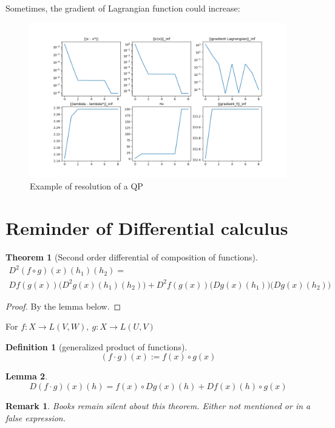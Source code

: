 \documentclass{report}
\newtheorem{theo}{Theorem}[section]
\newtheorem{lem}[theo]{Lemma}
\newtheorem{defi}{Definition}[section]
\newtheorem*{remark}{Remark}
\begin{document}
 Sometimes, the gradient of Lagrangian function could increase:
 \begin{figure}[h]
\centering
\includegraphics[scale=0.5]{monter3}
\caption{Example of resolution of a QP}
\end{figure}

\section*{Reminder of Differential calculus}

\begin{theo}[Second order differential of composition of functions]

\begin{multline*}
    D^2(f \circ g)(x)(h_1)(h_2) = \\ Df(g(x))\big(D^2g(x)(h_1)(h_2)\big) + D^2f(g(x))\big(Dg(x)(h_1)\big)\big(Dg(x)(h_2)\big)
\end{multline*}

\end{theo}
\begin{proof}
By the lemma below.
\end{proof}

\medskip
For $f: X \to L(V,W), \ g: X \to L(U, V)$
\begin{defi}[generalized product of functions]
\[
(f \cdot g) (x) := f(x) \circ g(x) 
\]
\end{defi}

\begin{lem}
\[
D(f\cdot g)(x)(h) = f(x) \circ Dg(x)(h) + Df(x)(h) \circ g(x) 
\]
\end{lem}

\begin{remark}
Books remain silent about this theorem. Either not mentioned or in a false expression.
\end{remark}


{}
\end{document}

